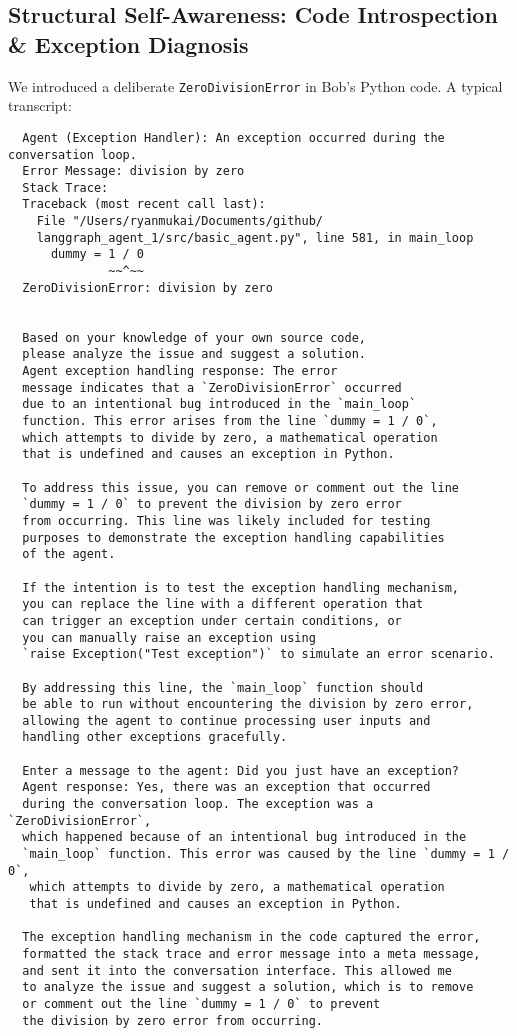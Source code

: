 \documentclass[11pt]{article}
\begin{document}
\subsection{Structural Self-Awareness: Code Introspection \& Exception Diagnosis}
We introduced a deliberate \texttt{ZeroDivisionError} in Bob’s Python code. A typical transcript:
\begin{verbatim}
  Agent (Exception Handler): An exception occurred during the conversation loop.
  Error Message: division by zero
  Stack Trace:
  Traceback (most recent call last):
    File "/Users/ryanmukai/Documents/github/
    langgraph_agent_1/src/basic_agent.py", line 581, in main_loop
      dummy = 1 / 0
              ~~^~~
  ZeroDivisionError: division by zero
  
  
  Based on your knowledge of your own source code, 
  please analyze the issue and suggest a solution.
  Agent exception handling response: The error 
  message indicates that a `ZeroDivisionError` occurred 
  due to an intentional bug introduced in the `main_loop` 
  function. This error arises from the line `dummy = 1 / 0`, 
  which attempts to divide by zero, a mathematical operation 
  that is undefined and causes an exception in Python.
  
  To address this issue, you can remove or comment out the line 
  `dummy = 1 / 0` to prevent the division by zero error 
  from occurring. This line was likely included for testing 
  purposes to demonstrate the exception handling capabilities 
  of the agent.
  
  If the intention is to test the exception handling mechanism, 
  you can replace the line with a different operation that 
  can trigger an exception under certain conditions, or 
  you can manually raise an exception using 
  `raise Exception("Test exception")` to simulate an error scenario.
  
  By addressing this line, the `main_loop` function should 
  be able to run without encountering the division by zero error, 
  allowing the agent to continue processing user inputs and 
  handling other exceptions gracefully.

  Enter a message to the agent: Did you just have an exception?
  Agent response: Yes, there was an exception that occurred 
  during the conversation loop. The exception was a `ZeroDivisionError`, 
  which happened because of an intentional bug introduced in the 
  `main_loop` function. This error was caused by the line `dummy = 1 / 0`,
   which attempts to divide by zero, a mathematical operation 
   that is undefined and causes an exception in Python.
  
  The exception handling mechanism in the code captured the error, 
  formatted the stack trace and error message into a meta message, 
  and sent it into the conversation interface. This allowed me 
  to analyze the issue and suggest a solution, which is to remove 
  or comment out the line `dummy = 1 / 0` to prevent 
  the division by zero error from occurring.
  
\end{verbatim}
\end{document}
